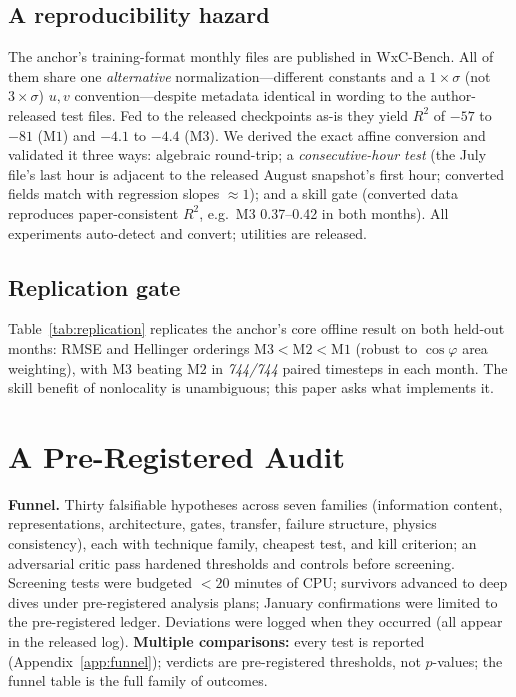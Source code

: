 \documentclass[10pt,twocolumn]{article}
\newcommand{\Mone}{\mathrm{M1}}
\newcommand{\Mtwo}{\mathrm{M2}}
\newcommand{\Mthree}{\mathrm{M3}}
\begin{document}
\subsection{A reproducibility hazard}\label{sec:hazard}
The anchor's training-format monthly files are published in WxC-Bench. All of them share one \emph{alternative} normalization---different constants and a $1\times\!\sigma$ (not $3\times\!\sigma$) $u,v$ convention---despite metadata identical in wording to the author-released test files. Fed to the released checkpoints as-is they yield $R^2$ of $-57$ to $-81$ ($\Mone$) and $-4.1$ to $-4.4$ ($\Mthree$). We derived the exact affine conversion and validated it three ways: algebraic round-trip; a \emph{consecutive-hour test} (the July file's last hour is adjacent to the released August snapshot's first hour; converted fields match with regression slopes ${\approx}1$); and a skill gate (converted data reproduces paper-consistent $R^2$, e.g.\ $\Mthree$ 0.37--0.42 in both months). All experiments auto-detect and convert; utilities are released.

\subsection{Replication gate}\label{sec:replication}
Table~\ref{tab:replication} replicates the anchor's core offline result on both held-out months: RMSE and Hellinger orderings $\Mthree{<}\Mtwo{<}\Mone$ (robust to $\cos\varphi$ area weighting), with $\Mthree$ beating $\Mtwo$ in \emph{744/744} paired timesteps in each month. The skill benefit of nonlocality is unambiguous; this paper asks what implements it.

\begin{table}[t]\centering\small
\caption{Full-month replication on held-out data (744 hourly timesteps per month). RMSE in normalized space; Hellinger $H$ and variance ratio $\sigma^2_{\hat F}/\sigma^2_F$ in physical space. Source: \texttt{results/a4\_fullmonth}, \texttt{a4\_january}.}
\label{tab:replication}
\resizebox{\columnwidth}{!}{}
\end{table}

\section{A Pre-Registered Audit}\label{sec:method}

\textbf{Funnel.} Thirty falsifiable hypotheses across seven families (information content, representations, architecture, gates, transfer, failure structure, physics consistency), each with technique family, cheapest test, and kill criterion; an adversarial critic pass hardened thresholds and controls before screening. Screening tests were budgeted ${<}20$ minutes of CPU; survivors advanced to deep dives under pre-registered analysis plans; January confirmations were limited to the pre-registered ledger. Deviations were logged when they occurred (all appear in the released log). \textbf{Multiple comparisons:} every test is reported (Appendix~\ref{app:funnel}); verdicts are pre-registered thresholds, not $p$-values; the funnel table is the full family of outcomes.
\end{document}
